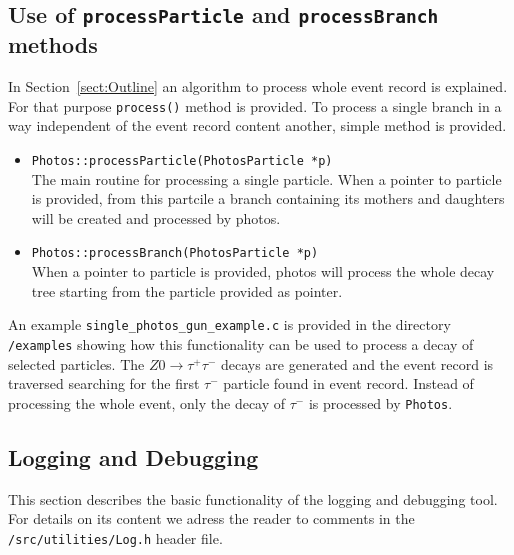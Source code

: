 \documentclass[]{Photos_interface_design}
\begin{document}
\subsection{Use of {\tt processParticle} and {\tt processBranch} methods}
\label{PHOTOSgun}

In Section~\ref{sect:Outline} an algorithm to process whole event record is explained.
For that purpose {\tt process()} method is provided.
To process a single branch in a way independent of the
event record content another, simple method is provided.

\begin{itemize}
  \item {\tt Photos::processParticle(PhotosParticle *p) } \hfill \\
		The main routine for processing a single particle. When a pointer to particle
		is provided, from this partcile a branch containing its mothers and daughters
		will be created and processed by photos.
  \item {\tt Photos::processBranch(PhotosParticle *p) } \hfill \\
 		When a pointer to particle is provided, photos will process the whole decay
		tree starting from the particle	provided as pointer.
\end{itemize}

An example {\tt single\_photos\_gun\_example.c} is provided in the directory {\tt /examples}
showing how this functionality can be used to process a decay of selected particles.
The $Z0 \rightarrow \tau^+ \tau^-$ decays are generated and the event record is traversed
searching for the first $\tau^-$ particle found in event record.
Instead of processing the whole event, only the decay of $\tau^-$ is processed by {\tt Photos}.


\subsection{Logging and Debugging}
\label{App:Logging}
This section describes the basic functionality of the logging and debugging tool.
For details on its content we adress the reader to comments in the {\tt /src/utilities/Log.h} header file.
\end{document}
